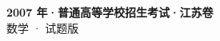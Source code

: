 \documentclass[zihao=-4, a4paper]{ctexart}
\begin{document}
\begin{center}
  {\Large\bfseries 2007 年·普通高等学校招生考试·江苏卷}\\[4pt]
  {\large 数学 · 试题版}
\end{center}
\medskip
{}

\end{document}
